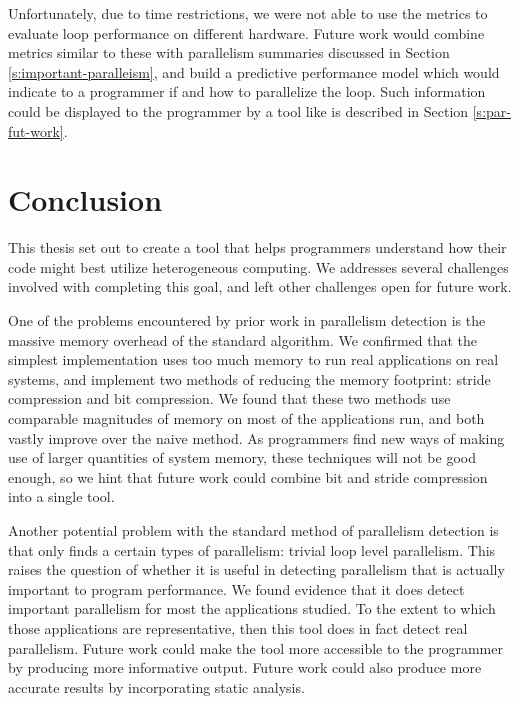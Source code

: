 \documentclass[12pt,twoside]{reedthesis}
\begin{document}
		Unfortunately, due to time restrictions, we were not able to use the metrics to evaluate loop performance on different hardware. Future work would combine metrics similar to these with parallelism summaries discussed in Section \ref{s:important-paralleism}, and build a predictive performance model which would indicate to a programmer if and how to parallelize the loop. Such information could be displayed to the programmer by a tool like is described in Section \ref{s:par-fut-work}.

\chapter*{Conclusion}
	\setcounter{chapter}{4}
	\setcounter{section}{0}

	This thesis set out to create a tool that helps programmers understand how their code might best utilize heterogeneous computing. We addresses several challenges involved with completing this goal, and left other challenges open for future work. %
	
	One of the problems encountered by prior work in parallelism detection is the massive memory overhead of the standard algorithm.
	We confirmed that the simplest implementation uses too much memory to run real applications on real systems, and implement two methods of reducing the memory footprint: stride compression and bit compression. We found that these two methods use comparable magnitudes of memory on most of the applications run, and both vastly improve over the naive method. As programmers find new ways of making use of larger quantities of system memory, these techniques will not be good enough, so we hint that future work could combine bit and stride compression into a single tool. 
	
	Another potential problem with the standard method of parallelism detection is that only finds a certain types of parallelism: trivial loop level parallelism. This raises the question of whether it is useful in detecting parallelism that is actually important to program performance. We found evidence that it does detect important parallelism for most the applications studied. To the extent to which those applications are representative, then this tool does in fact detect real parallelism. 
	Future work could make the tool more accessible to the programmer by producing more informative output. Future work could also produce more accurate results by incorporating static analysis. 
	
\end{document}

